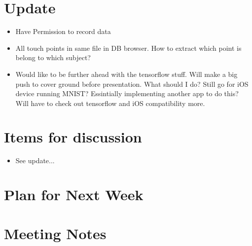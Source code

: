 \documentclass[]{weekly-report}
\begin{document}

\def\studentname{Philip Corr}
\def\projecttitle{ConvNets for iOS Gesture Recognition Applications}
\def\ucdstudentnumber{12318581}
\def\weeklyreportnumber{9}
\maketitle


\section{Update}

\begin{itemize}

\item Have Permission to record data

\item All touch points in same file in DB browser. How to extract which point is belong to which subject?

\item Would like to be further ahead with the tensorflow stuff. Will make a big push to cover ground before presentation. What should I do? Still go for iOS device running MNIST? Essintially implementing another app to do this? Will have to check out tensorflow and iOS compatibility more.
	
\end{itemize}

\section{Items for discussion}

\begin{itemize}
\item See update...
 

\end{itemize}

\section{Plan for Next Week}



\section{Meeting Notes}





{}



\label{last_page}

 
\end{document}
